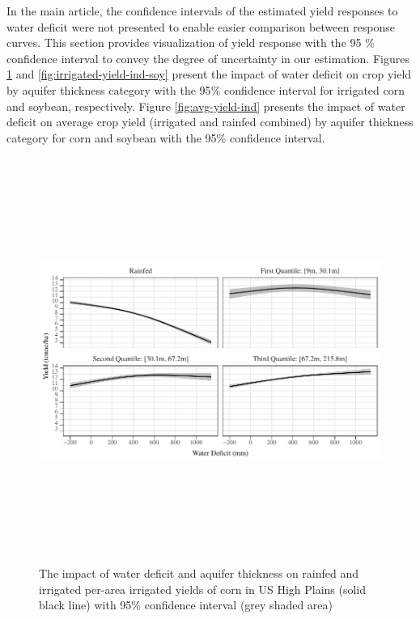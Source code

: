 \documentclass[
]{article}
\begin{document}
\setcounter{figure}{0}
\renewcommand{\thefigure}{A.\arabic{figure}}

In the main article, the confidence intervals of the estimated yield responses to water deficit were not presented to enable easier comparison between response curves. This section provides visualization of yield response with the 95 \(\%\) confidence interval to convey the degree of uncertainty in our estimation. Figures \ref{fig:irrigated-yield-ind-corn} and \ref{fig:irrigated-yield-ind-soy} present the impact of water deficit on crop yield by aquifer thickness category with the 95\(\%\) confidence interval for irrigated corn and soybean, respectively. Figure \ref{fig:avg-yield-ind} presents the impact of water deficit on average crop yield (irrigated and rainfed combined) by aquifer thickness category for corn and soybean with the 95\(\%\) confidence interval.

\begin{figure}[H]

{\centering \includegraphics[width=6in,height=500px,]{../../Figures/g_yield_with_conf_corn} 

}

\caption{The impact of water deficit and aquifer thickness on rainfed and irrigated per-area irrigated yields of corn in US High Plains (solid black line) with 95\% confidence interval (grey shaded area)}\label{fig:irrigated-yield-ind-corn}
\end{figure}
\end{document}
